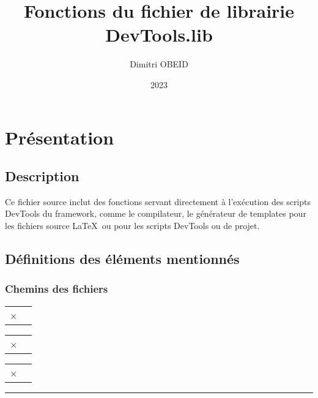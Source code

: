\documentclass[a4paper,10pt]{article}
\title{\color{sec1}Fonctions du fichier de librairie \color{path}DevTools.lib}\color{text}
\author{Dimitri OBEID}
\date{2023}
\begin{document}
\maketitle
\newpage

\hypertarget{contents}{}
\tableofcontents
\newpage

\color{sec1}
\section{Présentation}\color{text}

\color{sec2}
\subsection{Description}\color{text}

\begin{justify}
    Ce fichier source inclut des fonctions servant directement à l'exécution des scripts DevTools du framework, comme le compilateur, le générateur de templates pour les fichiers source \LaTeX \ ou pour les scripts DevTools ou de projet.
\end{justify}

\color{sec2}
\subsection{Définitions des éléments mentionnés}\color{text}

\color{sec3}
\subsubsection{Chemins des fichiers}\color{text}

\begin{justify}
    \begin{tabular}{|l|l|}
     ×
    \end{tabular}

    \begin{tabular}{|l|l|}
     ×
    \end{tabular}

    \begin{tabular}{|l|l|}
     ×
    \end{tabular}
\end{justify}



\color{sec3}\par\noindent\rule{\textwidth}{0.4pt}\color{text}\setlength{\parskip}{1em}
\end{document}
